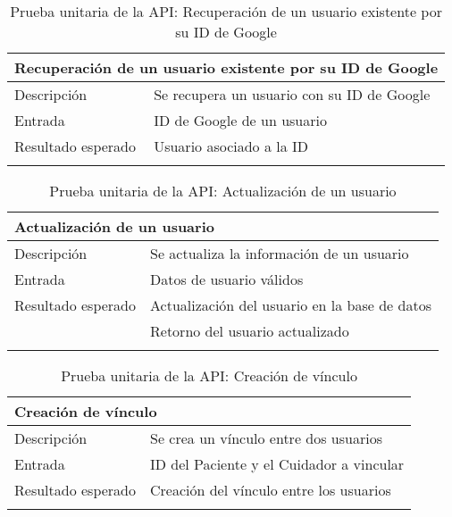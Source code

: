 \vspace{-20pt}
\begin{longtable}{|p{} p{}|}
    \hline
    \multicolumn{2}{|l|}{\textbf{Recuperación de un usuario existente por su ID de Google}} \\ \hline 
    Descripción                 & Se recupera un usuario con su ID de Google \\ \hline
    Entrada                     & ID de Google de un usuario \\ \hline
    Resultado esperado          & Usuario asociado a la ID \\  \hline
    \caption{Prueba unitaria de la API: Recuperación de un usuario existente por su ID de Google}
    \label{cp:u:api:recuperar_usuario_googleid}
\end{longtable}

\vspace{-20pt}
\begin{longtable}{|p{} p{}|}
    \hline
    \multicolumn{2}{|l|}{\textbf{Actualización de un usuario}} \\ \hline 
    Descripción                 & Se actualiza la información de un usuario \\ \hline
    Entrada                     & Datos de usuario válidos \\ \hline
    Resultado esperado          & Actualización del usuario en la base de datos \\
                                & Retorno del usuario actualizado \\ \hline
    \caption{Prueba unitaria de la API: Actualización de un usuario}
    \label{cp:u:api:actualizar_usuario}
\end{longtable}

\begin{longtable}{|p{} p{}|}
    \hline
    \multicolumn{2}{|l|}{\textbf{Creación de vínculo}} \\ \hline 
    Descripción                 & Se crea un vínculo entre dos usuarios \\ \hline
    Entrada                     & ID del Paciente y el Cuidador a vincular \\ \hline
    Resultado esperado          & Creación del vínculo entre los usuarios \\  \hline
    \caption{Prueba unitaria de la API: Creación de vínculo}
    \label{cp:u:api:crear_vinculo}
\end{longtable}

